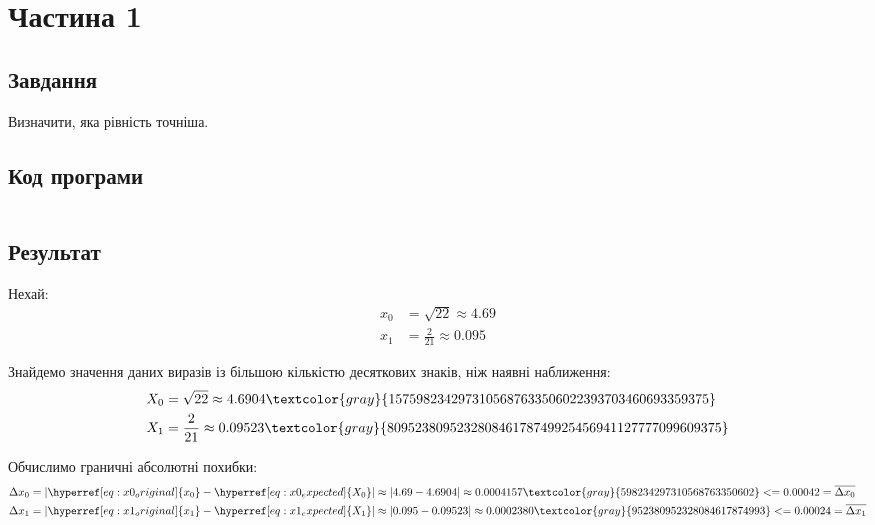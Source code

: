 \section{Частина 1}
\label{sec:task1}

\subsection{Завдання}
\label{subsec:task1_task}

Визначити, яка рівність точніша.

\subsection{Код програми}
\label{subsec:task1_code}
\inputminted{python}{../src/task1.py}

\subsection{Результат}
\label{subsec:task1_result}

Нехай:
\begin{align}
    x_0 & =
    \sqrt{22}
    \approx 4.69
    \label{eq:x0_original} \\
    x_1 & =
    \frac{2}{21}
    \approx 0.095
    \label{eq:x1_original}
\end{align}

Знайдемо значення даних виразів із більшою кількістю
десяткових знаків, ніж наявні наближення:
\begin{align}
    X_0 & =
    \sqrt{22}
    \approx 4.6904\textcolor{gray}{1575982342973105687633506022393703460693359375}
    \label{eq:x0_expected} \\
    X_1 & =
    \frac{2}{21}
    \approx 0.09523\textcolor{gray}{809523809523280846178749925456941127777099609375}
    \label{eq:x1_expected}
\end{align}

Обчислимо граничні абсолютні похибки:
\begin{align}
    \Delta x_0 & =
    |\hyperref[eq:x0_original]{x_0} - \hyperref[eq:x0_expected]{X_0}|
    \approx |4.69 - 4.6904|
    \approx 0.0004157\textcolor{gray}{598234297310568763350602} <= 0.00042
    = \overline{\Delta x_0}
    \label{eq:x0_absolute_rounding_error} \\
    \Delta x_1 & =
    |\hyperref[eq:x1_original]{x_1} - \hyperref[eq:x1_expected]{X_1}|
    \approx |0.095 - 0.09523|
    \approx 0.0002380\textcolor{gray}{952380952328084617874993} <= 0.00024
    = \overline{\Delta x_1}
    \label{eq:x1_absolute_rounding_error}
\end{align}

